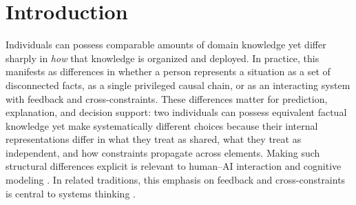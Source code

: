 \documentclass[11pt]{article}
\begin{document}
\begin{abstract}
for when investing in model revision is cost-effective and confirm this crossover in simulation.
With stakes active, Linear policies incur large exposure penalties because they ignore covariance-induced cross-terms from cumulative exposure, while Network policies learn factor-level exposures and track cumulative exposure, maintaining positive utility (for example, at $K{=}200$ with stakes on, mean utility $66.78$ for Network vs.\ $-929.11$ for Linear).
These results evaluate internal consistency of a DLN-to-computation mapping under explicit assumptions; they do not validate a developmental theory in humans.
\end{abstract}








\section{Introduction}

Individuals can possess comparable amounts of domain knowledge yet differ sharply in \emph{how} that knowledge is organized and deployed. In practice, this manifests as differences in whether a person represents a situation as a set of disconnected facts, as a single privileged causal chain, or as an interacting system with feedback and cross-constraints. These differences matter for prediction, explanation, and decision support: two individuals can possess equivalent factual knowledge yet make systematically different choices because their internal representations differ in what they treat as shared, what they treat as independent, and how constraints propagate across elements. Making such structural differences explicit is relevant to human--AI interaction and cognitive modeling \cite{LakeEtAl2017}. In related traditions, this emphasis on feedback and cross-constraints is central to systems thinking \cite{Senge1990,Meadows2008}.
\end{document}
